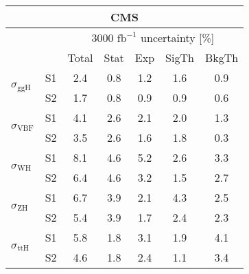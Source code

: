 \begin{tabular}{@{} l c c@{\hskip 0.15in} c c c c @{}}
 \hline
 \multicolumn{7}{c}{CMS}\\
 \hline
  &  & \multicolumn{5}{c}{3000 $\text{fb}^{-1}$ uncertainty [\%]} \\
  &  & Total & Stat & Exp & SigTh & BkgTh \\
 \hline
\multirow{2}{*}{$\sigma_{\mathrm{ggH}}$} & S1  & 2.4& 0.8 & 1.2 & 1.6 & 0.9  \\[1pt]
                        & S2  & 1.7& 0.8 & 0.9 & 0.9 & 0.6  \\[4pt]
\multirow{2}{*}{$\sigma_{\mathrm{VBF}}$} & S1  & 4.1& 2.6 & 2.1 & 2.0 & 1.3  \\[1pt]
                        & S2  & 3.5& 2.6 & 1.6 & 1.8 & 0.3  \\[4pt]
\multirow{2}{*}{$\sigma_{\mathrm{WH}}$} & S1  & 8.1& 4.6 & 5.2 & 2.6 & 3.3  \\[1pt]
                        & S2  & 6.4& 4.6 & 3.2 & 1.5 & 2.7  \\[4pt]
\multirow{2}{*}{$\sigma_{\mathrm{ZH}}$} & S1  & 6.7& 3.9 & 2.1 & 4.3 & 2.5  \\[1pt]
                        & S2  & 5.4& 3.9 & 1.7 & 2.4 & 2.3  \\[4pt]
\multirow{2}{*}{$\sigma_{\mathrm{ttH}}$} & S1  & 5.8& 1.8 & 3.1 & 1.9 & 4.1  \\[1pt]
                        & S2  & 4.6& 1.8 & 2.4 & 1.1 & 3.4  \\[4pt]
\hline
\end{tabular}